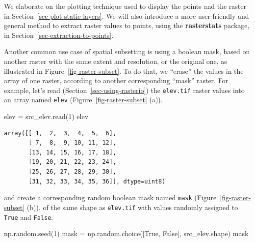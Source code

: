 \documentclass[
  letterpaper,
]{krantz}
\newenvironment{Shaded}{\begin{snugshade}}{\end{snugshade}}
\newcommand{\DecValTok}[1]{\textcolor[rgb]{0.68,0.00,0.00}{#1}}
\newcommand{\NormalTok}[1]{\textcolor[rgb]{0.00,0.23,0.31}{#1}}
\newcommand{\OperatorTok}[1]{\textcolor[rgb]{0.37,0.37,0.37}{#1}}
\newcommand{\VariableTok}[1]{\textcolor[rgb]{0.07,0.07,0.07}{#1}}
\begin{document}
\begin{tcolorbox}[enhanced jigsaw, title=\textcolor{quarto-callout-note-color}{\faInfo}\hspace{0.5em}{Note}, coltitle=black, colbacktitle=quarto-callout-note-color!10!white, breakable, titlerule=0mm, colframe=quarto-callout-note-color-frame, opacitybacktitle=0.6, colback=white, bottomrule=.15mm, left=2mm, leftrule=.75mm, toprule=.15mm, toptitle=1mm, bottomtitle=1mm, arc=.35mm, opacityback=0, rightrule=.15mm]

We elaborate on the plotting technique used to display the points and
the raster in Section~\ref{sec-plot-static-layers}. We will also
introduce a more user-friendly and general method to extract raster
values to points, using the \textbf{rasterstats} package, in
Section~\ref{sec-extraction-to-points}.

\end{tcolorbox}

Another common use case of spatial subsetting is using a boolean mask,
based on another raster with the same extent and resolution, or the
original one, as illustrated in Figure~\ref{fig-raster-subset}. To do
that, we ``erase'' the values in the array of one raster, according to
another corresponding ``mask'' raster. For example, let's read
(Section~\ref{sec-using-rasterio}) the \texttt{elev.tif} raster values
into an array named \texttt{elev} (Figure~\ref{fig-raster-subset} (a)).

\begin{Shaded}
\begin{Highlighting}[]
\NormalTok{elev }\OperatorTok{=}\NormalTok{ src\_elev.read(}\DecValTok{1}\NormalTok{)}
\NormalTok{elev}
\end{Highlighting}
\end{Shaded}

\begin{verbatim}
array([[ 1,  2,  3,  4,  5,  6],
       [ 7,  8,  9, 10, 11, 12],
       [13, 14, 15, 16, 17, 18],
       [19, 20, 21, 22, 23, 24],
       [25, 26, 27, 28, 29, 30],
       [31, 32, 33, 34, 35, 36]], dtype=uint8)
\end{verbatim}

and create a corresponding random boolean mask named \texttt{mask}
(Figure~\ref{fig-raster-subset} (b)), of the same shape as
\texttt{elev.tif} with values randomly assigned to \texttt{True} and
\texttt{False}.

\begin{Shaded}
\begin{Highlighting}[]
\NormalTok{np.random.seed(}\DecValTok{1}\NormalTok{)}
\NormalTok{mask }\OperatorTok{=}\NormalTok{ np.random.choice([}\VariableTok{True}\NormalTok{, }\VariableTok{False}\NormalTok{], src\_elev.shape)}
\NormalTok{mask}
\end{Highlighting}
\end{Shaded}
\end{document}

